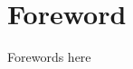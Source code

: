 



\begingroup

\let\clearpage\relax
\let\cleardoublepage\relax
\let\cleardoublepage\relax

\chapter*{Foreword}

Forewords here

\endgroup